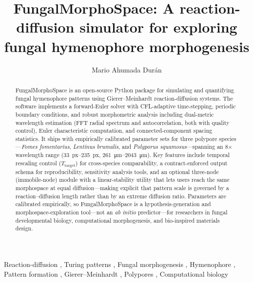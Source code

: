 \documentclass[review,3p]{elsarticle}
\begin{document}

\begin{frontmatter}

\title{FungalMorphoSpace: A reaction-diffusion simulator for exploring\\
fungal hymenophore morphogenesis}

\author[inst1]{Mario Ahumada Dur\'{a}n}


\begin{abstract}
FungalMorphoSpace is an open-source Python package for simulating and
quantifying fungal hymenophore patterns using Gierer--Meinhardt
reaction-diffusion systems. The software implements a forward-Euler
solver with CFL-adaptive time-stepping, periodic boundary conditions,
and robust morphometric analysis including dual-metric wavelength
estimation (FFT radial spectrum and autocorrelation, both with quality
control), Euler characteristic computation, and connected-component
spacing statistics. It ships with empirically calibrated parameter sets
for three polypore species---\textit{Fomes fomentarius},
\textit{Lentinus brumalis}, and \textit{Polyporus squamosus}---spanning
an 8$\times$ wavelength range (\SIrange{33}{235}{px},
\SIrange{261}{2043}{\micro\metre}). Key features include temporal
rescaling control ($T_\text{target}$) for cross-species comparability,
a contract-enforced output schema for reproducibility, sensitivity
analysis tools, and an optional three-node (immobile-node) module with a
linear-stability utility that lets users reach the same morphospace at
equal diffusion---making explicit that pattern scale is governed by a
reaction--diffusion length rather than by an extreme diffusion ratio.
Parameters are calibrated empirically, so FungalMorphoSpace is a
hypothesis-generation and morphospace-exploration tool---not an
\emph{ab initio} predictor---for researchers in fungal developmental
biology, computational morphogenesis, and bio-inspired materials design.
\end{abstract}

\begin{keyword}
Reaction-diffusion \sep
Turing patterns \sep
Fungal morphogenesis \sep
Hymenophore \sep
Pattern formation \sep
Gierer--Meinhardt \sep
Polypores \sep
Computational biology
\end{keyword}

\end{frontmatter}
\end{document}
